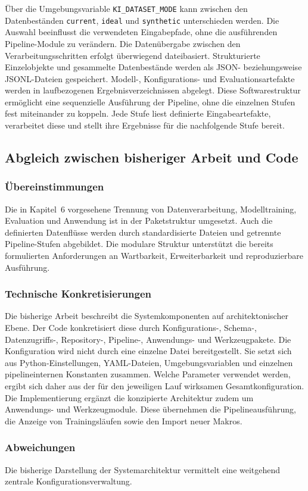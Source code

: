 Über die Umgebungsvariable \texttt{KI\_DATASET\_MODE} kann zwischen den Datenbeständen \texttt{current}, \texttt{ideal} und \texttt{synthetic} unterschieden werden. Die Auswahl beeinflusst die verwendeten Eingabepfade, 
ohne die ausführenden Pipeline-Module zu verändern. Die Datenübergabe zwischen den Verarbeitungsschritten erfolgt überwiegend dateibasiert. Strukturierte Einzelobjekte und gesammelte Datenbestände werden als JSON- beziehungsweise JSONL-Dateien gespeichert.
Modell-, Konfigurations- und Evaluationsartefakte werden in laufbezogenen Ergebnisverzeichnissen abgelegt. Diese Softwarestruktur ermöglicht eine sequenzielle Ausführung der Pipeline, ohne die einzelnen Stufen fest miteinander zu koppeln. 
Jede Stufe liest definierte Eingabeartefakte, verarbeitet diese und stellt ihre Ergebnisse für die nachfolgende Stufe bereit. 

\subsection{Abgleich zwischen bisheriger Arbeit und Code} 
\label{subsec:abgleich_softwarestruktur} 

\subsubsection*{Übereinstimmungen} 
Die in Kapitel~6 vorgesehene Trennung von Datenverarbeitung, Modelltraining, Evaluation und Anwendung ist in der Paketstruktur umgesetzt. 
Auch die definierten Datenflüsse werden durch standardisierte Dateien und getrennte Pipeline-Stufen abgebildet. Die modulare Struktur unterstützt die bereits formulierten Anforderungen an Wartbarkeit, 
Erweiterbarkeit und reproduzierbare Ausführung. 

\subsubsection*{Technische Konkretisierungen} 
Die bisherige Arbeit beschreibt die Systemkomponenten auf architektonischer Ebene. Der Code konkretisiert diese durch Konfigurations-, Schema-, Datenzugriffs-, Repository-, Pipeline-, Anwendungs- und Werkzeugpakete. 
Die Konfiguration wird nicht durch eine einzelne Datei bereitgestellt. Sie setzt sich aus Python-Einstellungen, YAML-Dateien, Umgebungsvariablen und einzelnen pipelineinternen Konstanten zusammen. Welche Parameter verwendet werden, 
ergibt sich daher aus der für den jeweiligen Lauf wirksamen Gesamtkonfiguration. Die Implementierung ergänzt die konzipierte Architektur zudem um Anwendungs- und Werkzeugmodule. Diese übernehmen die Pipelineausführung, 
die Anzeige von Trainingsläufen sowie den Import neuer Makros. \subsubsection*{Abweichungen} Die bisherige Darstellung der Systemarchitektur vermittelt eine weitgehend zentrale Konfigurationsverwaltung. 


